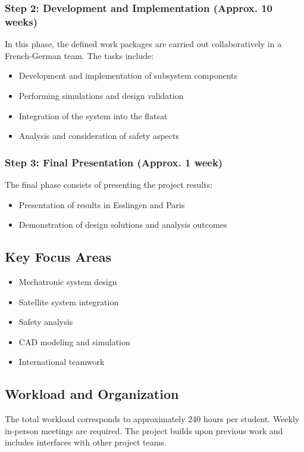 \subsubsection*{Step 2: Development and Implementation (Approx. 10 weeks)}
In this phase, the defined work packages are carried out collaboratively in a French-German team. The tasks include:
\begin{itemize}
	\item Development and implementation of subsystem components
	\item Performing simulations and design validation
	\item Integration of the system into the flatsat
	\item Analysis and consideration of safety aspects
\end{itemize}

\subsubsection*{Step 3: Final Presentation (Approx. 1 week)}
The final phase consists of presenting the project results:
\begin{itemize}
	\item Presentation of results in Esslingen and Paris
	\item Demonstration of design solutions and analysis outcomes
\end{itemize}

\subsection{Key Focus Areas}
\begin{itemize}
	\item Mechatronic system design
	\item Satellite system integration
	\item Safety analysis
	\item CAD modeling and simulation
	\item International teamwork
\end{itemize}

\subsection{Workload and Organization}
The total workload corresponds to approximately 240 hours per student. Weekly in-person meetings are required. 
The project builds upon previous work and includes interfaces with other project teams.
\newpage
